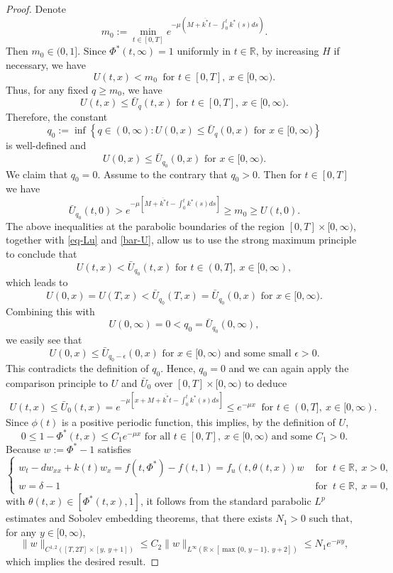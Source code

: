 \documentclass[11pt]{amsart}
\numberwithin{equation}{section}
\begin{document}
\begin{proof}
Denote
\[m_0:=\min_{t\in[0,T]} e^{-\mu(M+\overline{k^*}t-\int_0^tk^*(s)ds)}. \]
Then $m_0\in(0,1]$. Since $\Phi^*(t,\infty)=1$ uniformly in $t\in\mathbb R$, by increasing $H$ if necessary, we have
\[U(t,x)< m_0   \ \text{ for }t\in[0,T],~ x\in[0,\infty).\] Thus, for any fixed $q\geq m_0$, we have
\[U(t,x)\leq \bar{U}_q(t,x)\text{ for  }t\in[0,T],\ x\in[0,\infty).\]
Therefore, the constant 
\[q_0:=\inf\left\{q\in\left(0,\infty\right):U(0,x)\leq \bar{U}_q(0,x)\text{ for  }x\in[0,\infty)\right\}\]
is well-defined and 
\[U(0,x)\leq \bar{U}_{q_0}(0,x)\text{ for  } x\in[0,\infty).\]
  We claim that $q_0=0$.  Assume to the contrary that $q_0>0$. Then for $t\in[0,T]$ we have
\[\bar{U}_{q_0}(t,0)>e^{-\mu[M+\overline{k^*}t-\int_0^tk^*(s)ds]}\geq   m_0\geq U(t,0).\]
The above inequalities at the parabolic boundaries of the region $[0,T]\times [0,\infty)$, together with \eqref{eq-Lu} and \eqref{bar-U}, allow us to use the strong maximum principle to conclude that 
\[U(t,x)< \bar{U}_{q_0}(t,x) \text{ for }t\in(0,T],\ x\in[0,\infty),\]
which leads to
\[U(0,x)=U(T,x)<\bar{U}_{q_0}(T,x)=\bar{U}_{q_0}(0,x) \text{ for }  x\in[0,\infty).\]
Combining this with 
\[U(0,\infty)=0<q_0=\bar{U}_{q_0}(0,\infty),\]
we easily see  that
\[U(0,x)\leq \bar{U}_{q_0-\epsilon}(0,x)\text{ for  }x\in[0,\infty) \mbox{ and some small } \epsilon>0.\]
This contradicts the definition of $q_0$. Hence, $q_0=0$ and we can again apply the  comparison principle  to $U$ and $\bar{U}_0$  over  $[0,T]\times[0,\infty)$ to deduce
\begin{eqnarray*}
  U(t,x)\leq \bar{U}_0(t,x)= e^{-\mu[x+M+\overline{k^*}t-\int_0^tk^*(s)ds]} \leq  e^{-\mu x} \  \text{ for }t\in(0,T],\ x\in[0,\infty).
\end{eqnarray*}
Since $\phi(t)$ is a positive periodic function, this implies, by the definition of $U$, 
\[0\leq 1-\Phi^*(t,x)\leq C_1e^{-\mu x} \text{ for all } t\in[0,T],~x\in[0,\infty) \mbox{ and some } C_1>0.\] 
Because $w:=\Phi^*-1$ satisfies 
\[\begin{cases}
w_t-dw_{xx}+k(t)w_x=f(t,\Phi^*)-f(t,1)=f_u(t,\theta(t,x))w& \mbox{ for } \ t\in\mathbb R, \ x>0,\\
w=\delta-1& \mbox{ for }\ t\in\mathbb R,\ x=0,
\end{cases}\]
with $\theta(t,x)\in[\Phi^*(t,x),1]$,  it follows from the standard parabolic $L^p$ estimates and Sobolev embedding theorems, that  there exists $N_1>0$ such that, for any $y\in[0,\infty)$,
\[\|w\|_{C^{1, 2}([T,2T]\times[y,\ y+1])}\leq C_2 \|w\|_{L^{\infty}(\mathbb R\times [\max\{0,\, y-1\},\ y+2])}\leq N_1e^{-\mu y},\]
which implies the desired result.
\end{proof}
\end{document}
